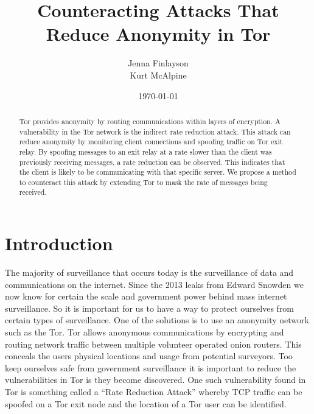 \documentclass[9pt,technote]{IEEEtran}
\title{Counteracting Attacks That Reduce Anonymity in Tor}
\date{\today}
\author{Jenna Finlayson\\Kurt McAlpine}
\begin{document}
\maketitle

\begin{abstract}
Tor provides anonymity by routing communications within layers of encryption. A
vulnerability in the Tor network is the indirect rate reduction attack. This
attack can reduce anonymity by monitoring client connections and spoofing
traffic on Tor exit relay. By spoofing messages to an exit relay at a rate
slower than the client was previously receiving messages, a rate reduction can
be observed. This indicates that the client is likely to be communicating with
that specific server. We propose a method to counteract this attack by
extending Tor to mask the rate of messages being received.
\end{abstract}

\section{Introduction}

The majority of surveillance that occurs today is the surveillance of data and
communications on the internet\cite{diffie2008brave}. Since the 2013 leaks from
Edward Snowden we now know for certain the scale and government power behind
mass internet surveillance. So it is important for us to have a way to protect
ourselves from certain types of surveillance. One of the solutions is to use an
anonymity network such as the Tor. Tor allows anonymous communications by
encrypting and routing network traffic between multiple volunteer operated
onion routers. This conceals the users physical locations and usage from
potential surveyors. Too keep ourselves safe from government surveillance it is
important to reduce the vulnerabilities in Tor is they become discovered. One
such vulnerability found in Tor is something called a ``Rate Reduction Attack''
whereby TCP traffic can be spoofed on a Tor exit node and the location of a Tor
user can be identified\cite{gilad2012spying}.




\end{document}
